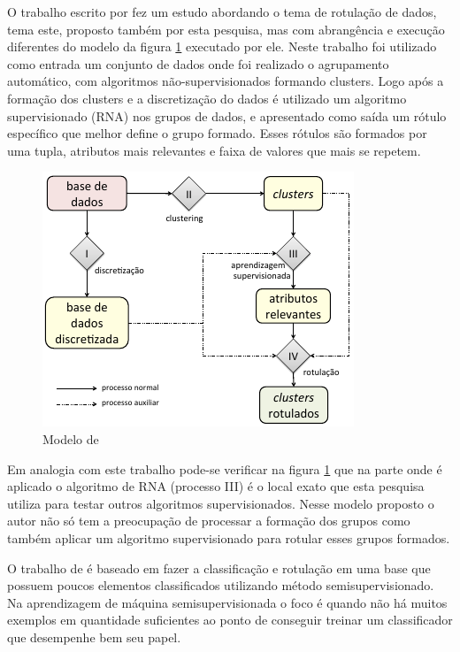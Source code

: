 O trabalho escrito por  fez um estudo abordando o tema de rotulação de dados, tema este, proposto também por esta pesquisa, mas com abrangência e execução diferentes do modelo da figura \ref{fig:modeloLOPES} executado por ele. Neste trabalho foi utilizado como entrada um conjunto de dados onde foi realizado o agrupamento automático, com algoritmos não-supervisionados formando  clusters. Logo após a formação dos clusters e a discretização do dados é utilizado um algoritmo supervisionado (RNA) nos grupos de dados, e apresentado como saída um rótulo específico que melhor define o grupo formado. Esses rótulos são formados por uma tupla, atributos mais relevantes e faixa de valores que mais se repetem.

\begin{figure}[h]
        \centering
        \includegraphics[scale=0.8]{figs/modeloLopes.png}
        \caption{Modelo de } 
        \label{fig:modeloLOPES}
\end{figure}

Em analogia com este trabalho pode-se verificar na figura \ref{fig:modeloLOPES} que na parte onde é aplicado o algoritmo  de RNA (processo III) é o local exato que esta pesquisa utiliza para testar outros algoritmos supervisionados. Nesse modelo proposto o autor não só tem a preocupação de processar  a formação dos grupos como também aplicar um algoritmo supervisionado para rotular esses grupos formados.




O trabalho de  é baseado em fazer a classificação e rotulação em uma base que possuem poucos elementos classificados utilizando método semisupervisionado. Na aprendizagem de máquina semisupervisionada o foco é quando não há muitos exemplos em quantidade suficientes ao ponto de conseguir treinar um classificador que desempenhe bem seu papel. 

